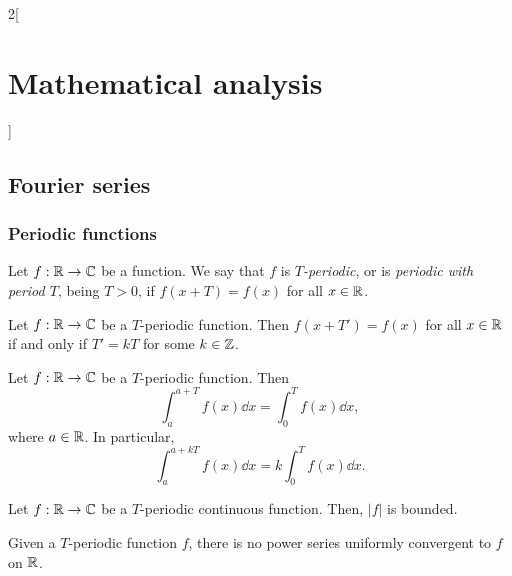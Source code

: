 \documentclass[../../../main.tex]{subfiles}
\begin{document}
\begin{multicols}{2}[\section{Mathematical analysis}]
  \subsection{Fourier series}
  \subsubsection{Periodic functions}
  \begin{definition}
    Let $f:\mathbb{R} \rightarrow\mathbb{C} $ be a function. We say that $f$ is \textit{$T$-periodic}, or is \textit{periodic with period $T$}, being $T>0$, if $f(x+T)=f(x)$ for all $x\in\mathbb{R} $.
  \end{definition}
  \begin{lemma}
    Let $f:\mathbb{R} \rightarrow\mathbb{C} $ be a $T$-periodic function. Then $f(x+T')=f(x)$ for all $x\in\mathbb{R} $ if and only if $T'=kT$ for some $k\in\mathbb{Z} $.
  \end{lemma}
  \begin{prop}
    Let $f:\mathbb{R} \rightarrow\mathbb{C} $ be a $T$-periodic function. Then $$\int_a^{a+T}f(x)\dd x=\int_0^Tf(x)\dd x,$$ where $a\in\mathbb{R} $. In particular, $$\int_a^{a+kT}f(x)\dd x=k\int_0^Tf(x)\dd x.$$
  \end{prop}
  \begin{lemma}
    Let $f:\mathbb{R} \rightarrow\mathbb{C} $ be a $T$-periodic continuous function. Then, $|f|$ is bounded.
  \end{lemma}
  \begin{prop}
    Given a $T$-periodic function $f$, there is no power series uniformly convergent to $f$ on $\mathbb{R} $.
  \end{prop}

\end{multicols}
\end{document}
